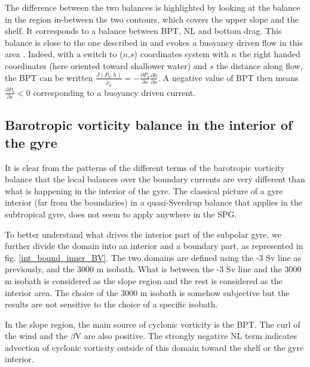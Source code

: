 \documentclass{ametsoc}
\newcommand{\jg}[1]{\textcolor{red}{JG: #1}}
\begin{document}
The difference between the two balances is highlighted by looking at the balance in the region in-between the two contours, which covers the upper slope and the shelf. It corresponds to a balance between BPT, NL and bottom drag. This balance is close to the one described in \citet{csanady1978} and evokes a buoyancy driven flow in this area \citep{chapman1989}. Indeed, with a switch to ($n$,$s$) coordinates system with $n$ the right handed coordinates (here oriented toward shallower water) and $s$ the distance along flow, the BPT can be written $\frac{J(P_b,h)}{\rho _0}=-\frac{\partial P_b}{\partial s }\frac{\partial h}{\partial n}$. A negative value of BPT then means $\frac{\partial P_b}{\partial s }<0$ corresponding to a buoyancy driven current.


\subsection{Barotropic vorticity balance in the interior of the gyre}

It is clear from the patterns of the different terms of the barotropic vorticity balance that the local balances over the boundary currents are very different than what is happening in the interior of the gyre. The classical picture of a gyre interior (far from the boundaries) in a quasi-Sverdrup balance that applies in the subtropical gyre,  does not seem to apply anywhere in the SPG. 

To better understand what drives the interior part of the subpolar gyre, we further divide the domain into an interior and a boundary part, as represented in fig. \ref{int_bound_inner_BV}. The two domains are defined using the -3 Sv line as previously, and the 3000 m isobath. What is between the -3 Sv line and the 3000 m isobath is considered as the slope region and the rest is considered as the interior area. The choice of the 3000 m isobath is somehow subjective but the results are not sensitive to the choice of a specific isobath. 

In the slope region, the main source of cyclonic vorticity is the BPT. The curl of the wind and the $\beta$V are also positive. The strongly negative NL term indicates advection of cyclonic vorticity outside of this domain toward the shelf or the gyre interior.
\end{document}
